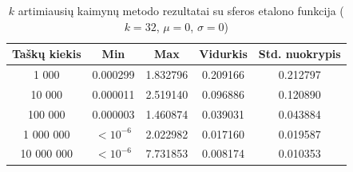 \begin{table}[H]
    \centering
    \begin{tabular}{|c|c|c|c|c|}
        \hline
        \textbf{Taškų kiekis} & \textbf{Min} & \textbf{Max} & \textbf{Vidurkis} & \textbf{Std. nuokrypis} \\ \hline
        1 000        & 0.000299 & 1.832796 & 0.209166 & 0.212797 \\ \hline
        10 000       & 0.000011 & 2.519140 & 0.096886 & 0.120890 \\ \hline
        100 000      & 0.000003 & 1.460874 & 0.039031 & 0.043884 \\ \hline
        1 000 000    & $<10^{-6}$ & 2.022982 & 0.017160 & 0.019587 \\ \hline
        10 000 000   & $<10^{-6}$ & 7.731853 & 0.008174 & 0.010353 \\ \hline
    \end{tabular}
    \caption{$k$ artimiausių kaimynų metodo rezultatai su sferos etalono funkcija ($k = 32$, $\mu = 0$, $\sigma = 0$)}
\end{table}